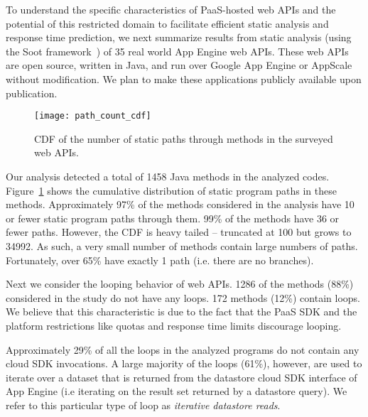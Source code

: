 
To understand the specific characteristics of PaaS-hosted web APIs and the potential
of this restricted domain to facilitate efficient static analysis and response time 
prediction,  we next summarize results from static analysis (using the Soot
framework~\cite{Vallee-Rai:2010:SJB:1925805.1925818}) of 
35 real world App Engine web APIs. These web APIs are open 
source, written in Java, and run over Google App Engine or AppScale without modification.
We plan to make these applications publicly available upon publication.  

\begin{figure}
\centering
\texttt{[image: path\_count\_cdf]}
\caption{CDF of the number of static paths through methods in the surveyed web APIs.
\label{fig:path_count_cdf}
}
\vspace{-0.2in}
\end{figure}

Our analysis detected a total of 1458 Java methods in the analyzed codes.
Figure~\ref{fig:path_count_cdf} shows the cumulative distribution of 
static program paths in these methods.
Approximately 97\% of the methods considered in the analysis have 10 or fewer 
static program paths through them.  99\% of 
the methods have 36 or fewer paths.
However, the CDF is heavy tailed --
truncated at 100 but grows to 34992. As such, 
a very small number of methods 
contain large numbers of paths.
Fortunately, over 65\% have exactly 1 path (i.e. there are no branches).

Next we consider the looping behavior of web APIs.  1286 of the methods (88\%)
considered in the study
do not have any loops. 172 methods (12\%) contain loops. 
We believe that this characteristic is due to the fact that 
the PaaS SDK and the platform restrictions like quotas and response time limits 
discourage looping.

Approximately 29\% of all the loops in 
the analyzed programs do not contain any cloud SDK invocations. 
A large majority of the loops (61\%), however, are
used to iterate over a dataset that is returned from the datastore cloud SDK interface 
of App Engine (i.e iterating on the result set 
returned by a datastore query). We refer to this particular type of 
loop as \textit{iterative datastore reads}. 

